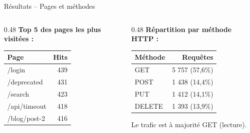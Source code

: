 \documentclass[aspectratio=169, 11pt]{beamer}
\begin{document}
\begin{frame}{Résultats -- Pages et méthodes}
  \begin{columns}[T]
    \begin{column}{0.48\textwidth}
      \textbf{Top 5 des pages les plus visitées :}
      \vspace{0.3em}
      \begin{table}
        \centering
        \begin{tabular}{lr}
          \toprule
          \textbf{Page} & \textbf{Hits} \\
          \midrule
          /login & 439 \\
          /deprecated & 431 \\
          /search & 423 \\
          /api/timeout & 418 \\
          /blog/post-2 & 416 \\
          \bottomrule
        \end{tabular}
      \end{table}
    \end{column}
    \begin{column}{0.48\textwidth}
      \textbf{Répartition par méthode HTTP :}
      \vspace{0.3em}
      \begin{table}
        \centering
        \begin{tabular}{lr}
          \toprule
          \textbf{Méthode} & \textbf{Requêtes} \\
          \midrule
          GET & 5 757 (57,6\%) \\
          POST & 1 438 (14,4\%) \\
          PUT & 1 412 (14,1\%) \\
          DELETE & 1 393 (13,9\%) \\
          \bottomrule
        \end{tabular}
      \end{table}

      \vspace{0.3em}
      \small
       Le trafic est à majorité GET (lecture).
    \end{column}
  \end{columns}
\end{frame}
\end{document}
